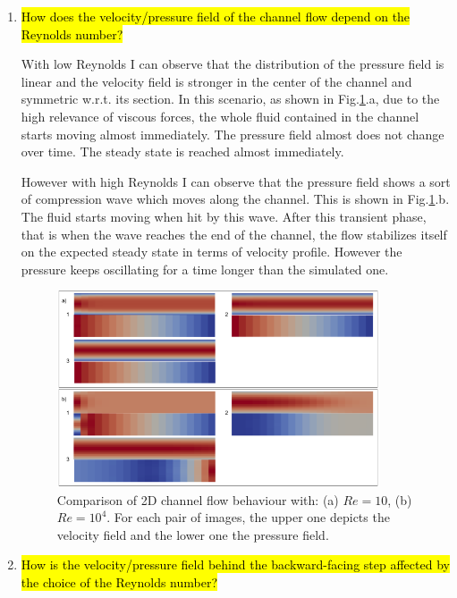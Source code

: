 \documentclass[11pt,a4paper,DIV12,pdftex]{scrartcl}
\begin{document}
\begin{enumerate}
	\item \hl{How does the velocity/pressure field of the channel flow depend on the Reynolds number?}

	With low Reynolds I can observe that the distribution of the pressure field is linear and the velocity field is stronger in the center of the channel and symmetric w.r.t. its section. In this scenario, as shown in Fig.\ref{fig:Channel2D_ReComparison}.a, due to the high relevance of viscous forces, the whole fluid contained in the channel starts moving almost immediately. The pressure field almost does not change over time. The steady state is reached almost immediately.

	However with high Reynolds I can observe that the pressure field shows a sort of compression wave which moves along the channel. This is shown in Fig.\ref{fig:Channel2D_ReComparison}.b. The fluid starts moving when hit by this wave. After this transient phase, that is when the wave reaches the end of the channel, the flow stabilizes itself on the expected steady state in terms of velocity profile. However the pressure keeps oscillating for a time longer than the simulated one.

	\begin{figure}[h!]
		\begin{center}
			\includegraphics[width=0.9\textwidth]{Figures/Channel2D_ReComparison.png}
			\caption{Comparison of 2D channel flow behaviour with: (a) $Re=10$, (b) $Re=10^4$. For each pair of images, the upper one depicts the velocity field and the lower one the pressure field.}
			\label{fig:Channel2D_ReComparison}
		\end{center}
	\end{figure}

	\item \hl{How is the velocity/pressure field behind the backward-facing step affected by the choice of the Reynolds number?}


\end{enumerate}
\end{document}
